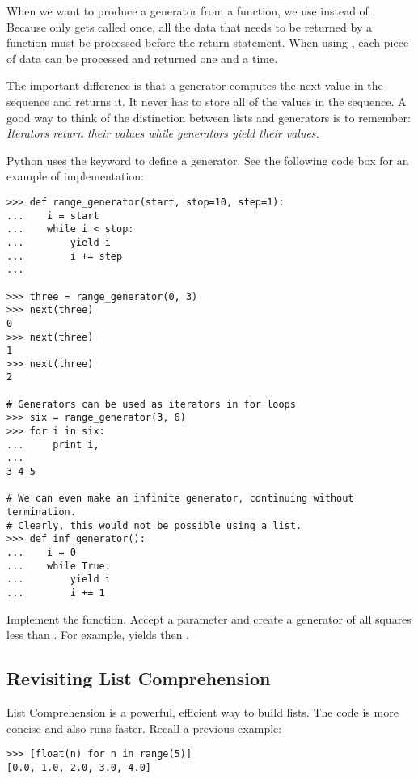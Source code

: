 When we want to produce a generator from a function, we use  instead of . Because  only gets called once, all the data that needs to be returned by a function must be processed before the return statement. When using , each piece of data can be processed and returned one and a time.

The important difference is that a generator computes the next value in the sequence and returns it. It never has to store all of the values in the sequence. A good way to think of the distinction between lists and generators is to remember: \emph{Iterators return their values while generators yield their values.}

Python uses the  keyword to define a generator. See the following code box for an example of implementation:
\begin{lstlisting}
>>> def range_generator(start, stop=10, step=1):
...    i = start
...    while i < stop:
...        yield i 
...        i += step
...

>>> three = range_generator(0, 3)
>>> next(three)
0
>>> next(three)
1
>>> next(three)
2

# Generators can be used as iterators in for loops
>>> six = range_generator(3, 6)
>>> for i in six:
...     print i,
...
3 4 5

# We can even make an infinite generator, continuing without termination.
# Clearly, this would not be possible using a list.
>>> def inf_generator():
...    i = 0
...    while True:
...        yield i
...        i += 1
\end{lstlisting}

\begin{problem}
Implement the  function.
Accept a parameter  and create a generator of all squares less than .
For example,  yields  then .
\end{problem}


\subsection*{Revisiting List Comprehension}
List Comprehension is a powerful, efficient way to build lists.
The code is more concise and also runs faster.
Recall a previous example:
\begin{lstlisting}
>>> [float(n) for n in range(5)]
[0.0, 1.0, 2.0, 3.0, 4.0]
\end{lstlisting}

